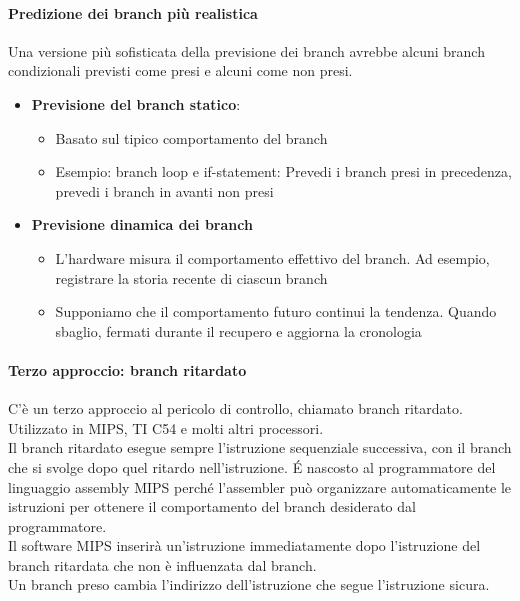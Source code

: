 \documentclass[12pt,a4paper]{article}
\begin{document}
\paragraph{Predizione dei branch più realistica}
Una versione più sofisticata della previsione dei branch avrebbe alcuni branch condizionali previsti come presi e alcuni come non presi.
\begin{itemize}
\item \textbf{Previsione del branch statico}:
\begin{itemize}
\item Basato sul tipico comportamento del branch
\item Esempio: branch loop e if-statement: Prevedi i branch presi in precedenza, prevedi i branch in avanti non presi\end{itemize}
\item \textbf{Previsione dinamica dei branch}
\begin{itemize}
\item L'hardware misura il comportamento effettivo del branch. Ad esempio, registrare la storia recente di ciascun branch
\item Supponiamo che il comportamento futuro continui la tendenza. Quando sbaglio, fermati durante il recupero e aggiorna la cronologia
\end{itemize}\end{itemize}

\paragraph{Terzo approccio: branch ritardato}
C'è un terzo approccio al pericolo di controllo, chiamato branch ritardato. Utilizzato in MIPS, TI C54 e molti altri processori.\\
Il branch ritardato esegue sempre l'istruzione sequenziale successiva, con il branch che si svolge dopo quel ritardo nell'istruzione. \'E nascosto al programmatore del linguaggio assembly MIPS perché l'assembler può organizzare automaticamente le istruzioni per ottenere il comportamento del branch desiderato dal programmatore.\\
Il software MIPS inserirà un'istruzione immediatamente dopo l'istruzione del branch ritardata che non è influenzata dal branch.\\ Un branch preso cambia l'indirizzo dell'istruzione che segue l'istruzione sicura.
\end{document}
